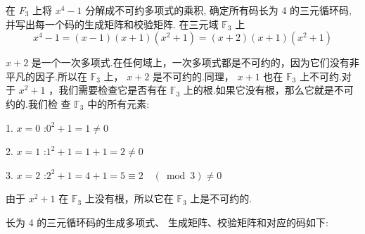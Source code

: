 \begin{tcolorbox}[breakable,colback=blue!5!white,colframe=blue!75!black,
 title= 解答题]
 
 在 $ F_{3} $ 上将 $ x^{4}-1 $ 分解成不可约多项式的乘积, 确定所有码长为 4 的三元循环码,并写出每一个码的生成矩阵和校验矩阵.
 \tcblower
在三元域 ${\mathbb{F}}_{3}$ 上
$$
x^{4}-1=(x-1)(x+1)\left(x^{2}+1\right)=(x+2)(x+1)\left(x^{2}+1\right) 
$$

$x + 2$ 是一个一次多项式.在任何域上，一次多项式都是不可约的，因为它们没有非平凡的因子.所以在 ${\mathbb{F}}_{3}$ 上， $x + 2$ 是不可约的.同理， $x + 1$ 也在 ${\mathbb{F}}_{3}$ 上不可约.对于 $x^{2} + 1$ ，我们需要检查它是否有在 ${\mathbb{F}}_{3}$ 上的根.如果它没有根，那么它就是不可约的.我们检 查 ${\mathbb{F}}_{3}$ 中的所有元素:

1. $x = 0$ :$0^{2} + 1 = 1 {\neq} 0$

2. $x = 1$ :$1^{2} + 1 = 1 + 1 = 2 {\neq} 0$

3. $x = 2$ :$2^{2} + 1 = 4 + 1 = 5 {\equiv} 2\quad\left( \ \operatorname{mod}\ 3 \right) {\neq} 0$

由于 $x^{2} + 1$ 在 ${\mathbb{F}}_{3}$ 上没有根，所以它在 ${\mathbb{F}}_{3}$ 上是不可约的.

 长为 4 的三元循环码的生成多项式、 生成矩阵、校验矩阵和对应的码如下:
  \end{tcolorbox}
